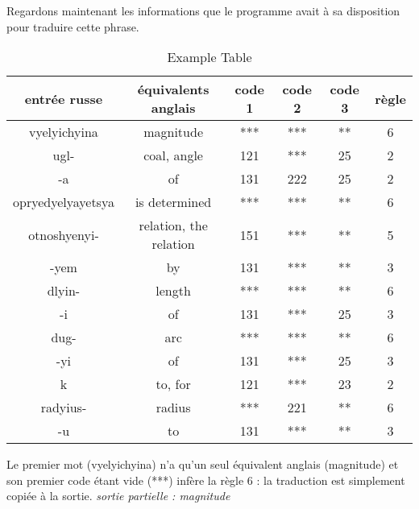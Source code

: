 \documentclass[11pt,a4paper]{report}
\begin{document}
    Regardons maintenant les informations que le programme avait à sa disposition pour traduire 
    cette phrase. 

    \begin{table}[h] %
      \centering %
      \begin{tabular}{|c|c|c|c|c|c|} %
          \hline %
          entrée russe & équivalents anglais & code 1 & code 2 & code 3 & règle \\ %
          \hline
          vyelyichyina & magnitude & *** & *** & ** & 6 \\
          \hline
          ugl- & coal, angle & 121 & *** & 25 & 2 \\
          \hline 
          -a & of & 131 & 222 & 25 & 2 \\
          \hline 
          opryedyelyayetsya & is determined & *** & *** & ** & 6 \\
          \hline 
          otnoshyenyi- & relation, the relation & 151 & *** & ** & 5 \\ 
          \hline 
          -yem & by & 131 & *** & ** & 3 \\ 
          \hline 
          dlyin- & length & *** & *** & ** & 6 \\ 
          \hline 
          -i & of & 131 & *** & 25 & 3 \\ 
          \hline 
          dug- & arc & *** & *** & ** & 6 \\
          \hline 
          -yi & of & 131 & *** & 25 & 3 \\ 
          \hline 
          k & to, for & 121 & *** & 23 & 2 \\ 
          \hline 
          radyius- & radius & *** & 221 & ** & 6 \\ 
          \hline 
          -u & to & 131 & *** & ** & 3 \\
          \hline
      \end{tabular}
      \caption{Example Table} %
      \label{tab:example} %
  \end{table}

  Le premier mot (vyelyichyina) n'a qu'un seul équivalent anglais (magnitude) et son 
  premier code étant vide (***) infère la règle 6 : la traduction est simplement copiée 
  à la sortie. \newline 
  \textit{sortie partielle : magnitude} 
\end{document}

